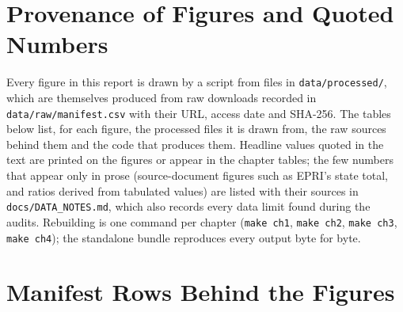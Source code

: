\appendix
\chapter{Provenance of Figures and Quoted Numbers}
\label{app:provenance}

Every figure in this report is drawn by a script from files in \texttt{data/processed/}, which are themselves produced from raw downloads recorded in \texttt{data/raw/manifest.csv} with their URL, access date and SHA-256. The tables below list, for each figure, the processed files it is drawn from, the raw sources behind them and the code that produces them. Headline values quoted in the text are printed on the figures or appear in the chapter tables; the few numbers that appear only in prose (source-document figures such as EPRI's state total, and ratios derived from tabulated values) are listed with their sources in \texttt{docs/DATA\_NOTES.md}, which also records every data limit found during the audits. Rebuilding is one command per chapter (\texttt{make ch1}, \texttt{make ch2}, \texttt{make ch3}, \texttt{make ch4}); the standalone bundle reproduces every output byte for byte.

\begin{table}[H]
\centering\scriptsize
\caption{Chapter~\ref{ch:current} figures: processed files, raw sources and code.}
\resizebox{\textwidth}{!}{}
\end{table}

\begin{table}[H]
\centering\scriptsize
\caption{Chapter~\ref{ch:growth} figures: processed files, raw sources and code.}
\resizebox{\textwidth}{!}{}
\end{table}

\begin{table}[H]
\centering\scriptsize
\caption{Chapter~\ref{ch:supply} figures: processed files, raw sources and code.}
\resizebox{\textwidth}{!}{}
\end{table}

\begin{table}[H]
\centering\scriptsize
\caption{Chapter~\ref{ch:together} figures: processed files, raw sources and code.}
\resizebox{\textwidth}{!}{}
\end{table}

\chapter{Manifest Rows Behind the Figures}
\label{app:manifest}

